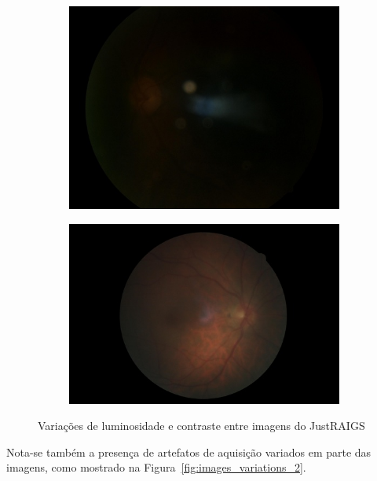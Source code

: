 \documentclass[12pt]{article}
\begin{document}
\begin{figure}
\begin{subfigure}[b]{0.2\textwidth}
        \includegraphics[width=\textwidth]{images/examples_from_dataset/TRAIN013211.JPG}
        \label{fig:images_variations_1_3}
    \end{subfigure}
    \hfill
    \begin{subfigure}[b]{0.2\textwidth}
        \centering
        \includegraphics[width=\textwidth]{images/examples_from_dataset/TRAIN061871.JPG}
        \label{fig:images_variations_1_4}
    \end{subfigure}
    \caption{Variações de luminosidade e contraste entre imagens do JustRAIGS}
    \label{fig:images_variations_1}
\end{figure}

Nota-se também a presença de artefatos de aquisição variados em parte das imagens, como mostrado na Figura~\ref{fig:images_variations_2}.
\end{document}
